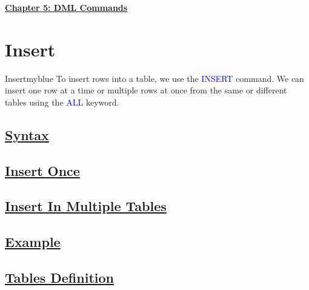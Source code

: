 \newpage 
\null 
\vspace{0.15cm}

\begin{center} 
\Huge{\textbf{\underline{Chapter 5: DML Commands}}}
\end{center}

\vspace{0.25cm}

\setcounter{section}{0}

\vspace{0.35cm}

\section{Insert}

\begin{prettyBox}{Insert}{myblue}
To insert rows into a table, we use the \textcolor{blue}{INSERT} command. We can insert one row at a time or multiple rows at once from the same or different tables using the \textcolor{blue}{ALL} keyword.
\end{prettyBox}

\subsection*{\underline{\textbf{Syntax}}}

\subsection*{\textbf{\underline{Insert Once}}}



\subsection*{\textbf{\underline{Insert In Multiple Tables}}}




\subsection*{\underline{\textbf{Example}}}

\subsection*{\underline{\textbf{Tables Definition}}}

